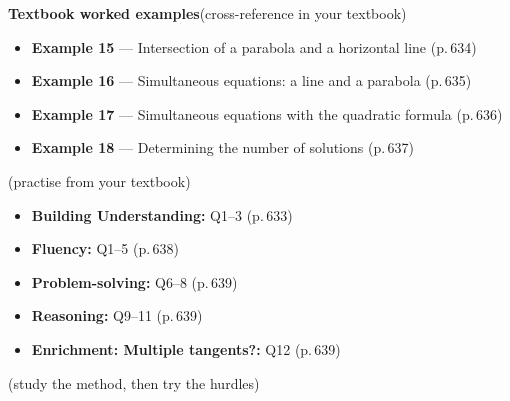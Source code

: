 \documentclass[11pt]{article}
\begin{document}
\begin{refbox}
{\bfseries\color{chalkdk}Textbook worked examples}\;\textcolor{inksoft}{\small(cross-reference in your textbook)}\\[3pt]
\begin{itemize}[leftmargin=16pt,itemsep=1pt,topsep=2pt]
  \item \textbf{Example 15} --- Intersection of a parabola and a horizontal line \textcolor{inksoft}{(p.\,634)}
  \item \textbf{Example 16} --- Simultaneous equations: a line and a parabola \textcolor{inksoft}{(p.\,635)}
  \item \textbf{Example 17} --- Simultaneous equations with the quadratic formula \textcolor{inksoft}{(p.\,636)}
  \item \textbf{Example 18} --- Determining the number of solutions \textcolor{inksoft}{(p.\,637)}
\end{itemize}
\;\textcolor{inksoft}{\small(practise from your textbook)}\\[3pt]
\begin{itemize}[leftmargin=16pt,itemsep=1pt,topsep=2pt]
  \item \textbf{Building Understanding:} Q1--3 \textcolor{inksoft}{(p.\,633)}
  \item \textbf{Fluency:} Q1--5 \textcolor{inksoft}{(p.\,638)}
  \item \textbf{Problem-solving:} Q6--8 \textcolor{inksoft}{(p.\,639)}
  \item \textbf{Reasoning:} Q9--11 \textcolor{inksoft}{(p.\,639)}
  \item \textbf{Enrichment: Multiple tangents?:} Q12 \textcolor{inksoft}{(p.\,639)}
\end{itemize}\end{refbox}

\;\textcolor{inksoft}{\small(study the method, then try the hurdles)}\par
\end{document}
